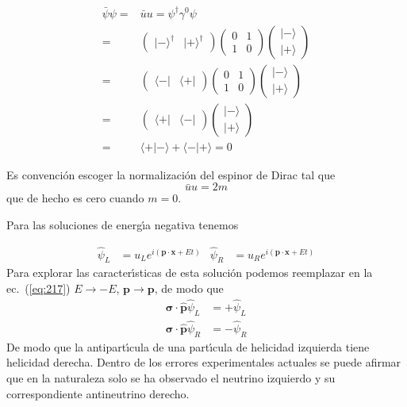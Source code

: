 \begin{subappendices}
\begin{align}
  \bar{\psi}\psi=&\bar{u}{u}=\psi^\dagger \gamma^0 \psi\nonumber\\
  =&\begin{pmatrix}
    |-\rangle^\dagger & |+\rangle^\dagger
  \end{pmatrix}
  \begin{pmatrix}
    0&1\\
    1&0    
  \end{pmatrix}
  \begin{pmatrix}
    |-\rangle\\
    |+\rangle
  \end{pmatrix}\nonumber\\
  =&\begin{pmatrix}
    \langle-| & \langle+|
  \end{pmatrix}
  \begin{pmatrix}
    0&1\\
    1&0    
  \end{pmatrix}
  \begin{pmatrix}
    |-\rangle\\
    |+\rangle
  \end{pmatrix}\nonumber\\
  =&\begin{pmatrix}
    \langle+| & \langle-| 
  \end{pmatrix}
  \begin{pmatrix}
    |-\rangle\\
    |+\rangle
  \end{pmatrix}\nonumber\\
  =&\langle+|-\rangle+\langle-|+\rangle=0
\end{align}

Es convenci\'on escoger la normalizaci\'on del espinor de Dirac tal que
\begin{equation}
  \bar{u}{u}=2m
\end{equation}
que de hecho es cero cuando $m=0$.

Para las soluciones de energ\'\i a negativa tenemos

\begin{align}
    \hat{\psi}_L&=u_L e^{i(\mathbf{p}\cdot \mathbf{x}+E t)} & \hat{\psi}_R&=u_R e^{i(\mathbf{p}\cdot \mathbf{x}+E t)}
\end{align}
Para explorar las caracter\'\i sticas de esta soluci\'on podemos reemplazar en la ec.~(\ref{eq:217}) $E\to-E$, $\mathbf{p}\to\mathbf{p}$, de modo que
\begin{align}
  \boldsymbol{\sigma}\cdot\hat{\mathbf{p}}\hat{\psi}_L &=+\hat{\psi}_L\nonumber\\
  \boldsymbol{\sigma}\cdot\hat{\mathbf{p}}\hat{\psi}_R&=-\hat{\psi}_R
\end{align}
De modo que la antipart\'\i cula de una part\'\i cula de helicidad izquierda tiene helicidad derecha. Dentro de los errores experimentales actuales se puede afirmar que en la naturaleza solo se ha observado el neutrino izquierdo y su correspondiente antineutrino derecho.


\end{subappendices}
